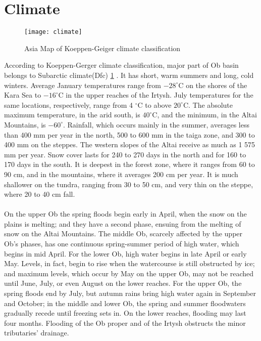 \section{Climate}
\begin{figure}[htbp]
	\centering
	\texttt{[image: climate]} %
	\caption{Asia Map of Koeppen-Geiger climate classification \cite{peel2007updated}} 
	\label{fig:climate}
\end{figure}
According to Koeppen-Gerger climate classification, major part of Ob basin belongs to Subarctic climate(Dfc) \ref{fig:climate} \cite{peel2007updated}. It has short, warm summers and long, cold winters. Average January temperatures range from  $-28 ^{\circ}$C on the shores of the Kara Sea to $-16 ^{\circ}$C in the upper reaches of the Irtysh. July temperatures for the same locations, respectively, range from 4 $^{\circ}$C to above $20 ^{\circ}$C. The absolute maximum temperature, in the arid south, is $40 ^{\circ}$C,\cite{Obriver} and the minimum, in the Altai Mountains, is $-60 ^{\circ}$. Rainfall, which occurs mainly in the summer, averages less than 400 mm per year in the north, 500 to 600 mm in the taiga zone, and 300 to 400 mm on the steppes. The western slopes of the Altai receive as much as 1 575 mm per year. Snow cover lasts for 240 to 270 days in the north and for 160 to 170 days in the south. It is deepest in the forest zone, where it ranges from 60 to 90 cm, and in the mountains, where it averages 200 cm per year. It is much shallower on the tundra, ranging from 30 to 50 cm, and very thin on the steppe, where 20 to 40 cm fall.\cite{Obriver}\\\\
On the upper Ob the spring floods begin early in April, when the snow on the plains is melting; and they have a second phase, ensuing from the melting of snow on the Altai Mountains. The middle Ob, scarcely affected by the upper Ob's phases, has one continuous spring-summer period of high water, which begins in mid April. For the lower Ob, high water begins in late April or early May. Levels, in fact, begin to rise when the watercourse is still obstructed by ice; and maximum levels, which occur by May on the upper Ob, may not be reached until June, July, or even August on the lower reaches. For the upper Ob, the spring floods end by July, but autumn rains bring high water again in September and October; in the middle and lower Ob, the spring and summer floodwaters gradually recede until freezing sets in. On the lower reaches, flooding may last four months. Flooding of the Ob proper and of the Irtysh obstructs the minor tributaries' drainage.

